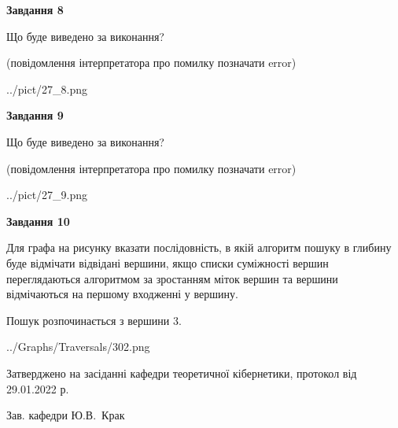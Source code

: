 \documentclass[12pt, ukrainian]{article}
\begin{document}
{\begin {large}
{\begin {center}\textbf{Завдання 8}\end {center}}\par
Що буде виведено за виконання?\par
 (повідомлення інтерпретатора про помилку позначати error)
\begin{center}
	{../pict/27_8.png}
\end{center}
\newpage

{\begin {center}\textbf{Завдання 9}\end {center}}\par
Що буде виведено за виконання?\par
 (повідомлення інтерпретатора про помилку позначати error)\par
\begin{center}
	{../pict/27_9.png}
\end{center}
\newpage

{\begin {center}\textbf{Завдання 10}\end {center}}\par
Для графа на рисунку вказати послідовність, в якій алгоритм пошуку в глибину буде відмічати відвідані вершини, якщо списки суміжності вершин переглядаються алгоритмом за зростанням міток вершин та вершини відмічаються на першому вход\-женні у вершину.\par
Пошук розпочинається з вершини 3.\par

\begin{center}
	{../Graphs/Traversals/302.png}
\end{center}\par
\newpage


\end {large}
}
{\smallskip \begin {small} Затверджено на засіданні кафедри теоретичної кібернетики, протокол  від   29.01.2022 р.\par\smallskip\smallskip
{\parbox {6.5 cm}{Зав. кафедри \dotfill Ю.В.~Крак}} \end{small}}
\end{document}
